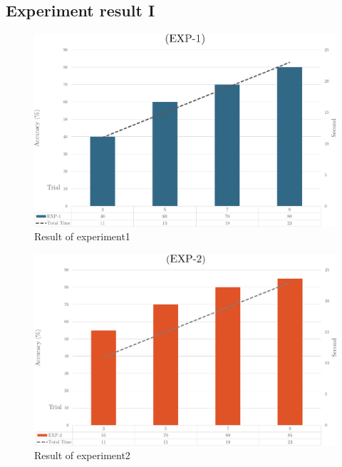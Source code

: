 \subsection{Experiment result I}
\begin{figure}[ht]
	\centering
	\includegraphics[width=\textwidth]{chapter7/result_1.pdf}
	\caption{Result of experiment1}
\end{figure}

\begin{figure}[ht]
	\centering
	\includegraphics[width=\textwidth]{chapter7/result_2.pdf}
	\caption{Result of experiment2}
\end{figure}


